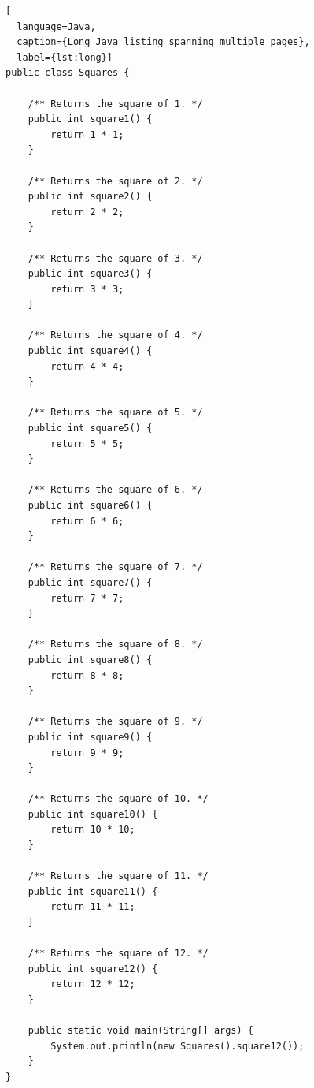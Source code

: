 \begin{lstlisting}[
  language=Java,
  caption={Long Java listing spanning multiple pages},
  label={lst:long}]
public class Squares {

    /** Returns the square of 1. */
    public int square1() {
        return 1 * 1;
    }

    /** Returns the square of 2. */
    public int square2() {
        return 2 * 2;
    }

    /** Returns the square of 3. */
    public int square3() {
        return 3 * 3;
    }

    /** Returns the square of 4. */
    public int square4() {
        return 4 * 4;
    }

    /** Returns the square of 5. */
    public int square5() {
        return 5 * 5;
    }

    /** Returns the square of 6. */
    public int square6() {
        return 6 * 6;
    }

    /** Returns the square of 7. */
    public int square7() {
        return 7 * 7;
    }

    /** Returns the square of 8. */
    public int square8() {
        return 8 * 8;
    }

    /** Returns the square of 9. */
    public int square9() {
        return 9 * 9;
    }

    /** Returns the square of 10. */
    public int square10() {
        return 10 * 10;
    }

    /** Returns the square of 11. */
    public int square11() {
        return 11 * 11;
    }

    /** Returns the square of 12. */
    public int square12() {
        return 12 * 12;
    }

    public static void main(String[] args) {
        System.out.println(new Squares().square12());
    }
}
\end{lstlisting}
